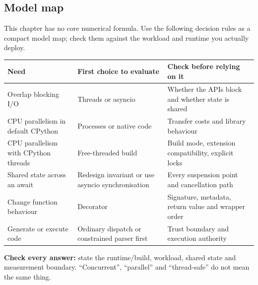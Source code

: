 \documentclass[11pt]{article}
\begin{document}
\begin{keepsection}
\section{Model map}

This chapter has no core numerical formula. Use the following decision rules as a compact model map; check them against the workload and runtime you actually deploy.

\begin{center}\small\begin{tabularx}{\linewidth}{>{\raggedright\arraybackslash}X>{\raggedright\arraybackslash}X>{\raggedright\arraybackslash}X}\toprule
\textbf{Need} & \textbf{First choice to evaluate} & \textbf{Check before relying on it} \\ \midrule
Overlap blocking I/O & Threads or asyncio & Whether the APIs block and whether state is shared \\
CPU parallelism in default CPython & Processes or native code & Transfer costs and library behaviour \\
CPU parallelism with CPython threads & Free-threaded build & Build mode, extension compatibility, explicit locks \\
Shared state across an await & Redesign invariant or use asyncio synchronisation & Every suspension point and cancellation path \\
Change function behaviour & Decorator & Signature, metadata, return value and wrapper order \\
Generate or execute code & Ordinary dispatch or constrained parser first & Trust boundary and execution authority \\
\bottomrule\end{tabularx}\end{center}

\begin{notebox}\textbf{Check every answer:} state the runtime/build, workload, shared state and measurement boundary. “Concurrent”, “parallel” and “thread-safe” do not mean the same thing.\end{notebox}
\end{keepsection}
\end{document}
